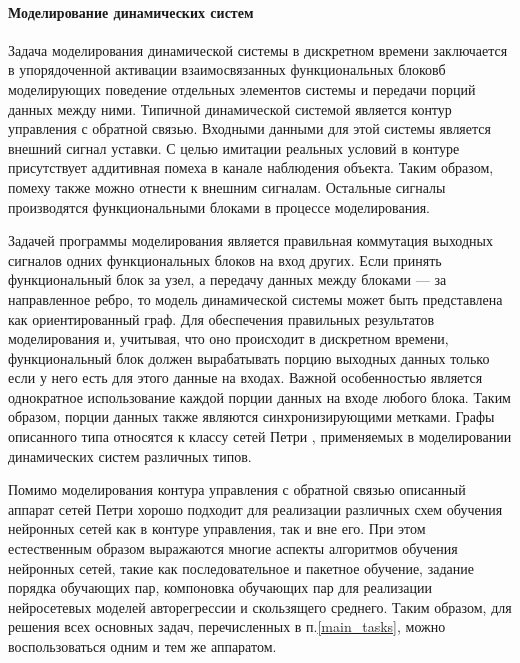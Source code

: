 \paragraph{Моделирование динамических систем}

Задача моделирования динамической системы в дискретном времени
заключается в упорядоченной активации взаимосвязанных функциональных
блоковб моделирующих поведение отдельных элементов системы и передачи
порций данных между ними.  Типичной динамической системой является
контур управления с обратной связью.  Входными данными для этой
системы является внешний сигнал уставки.  С целью имитации реальных
условий в контуре присутствует аддитивная помеха в канале наблюдения
объекта.  Таким образом, помеху также можно отнести к внешним
сигналам.  Остальные сигналы производятся функциональными блоками в
процессе моделирования.

Задачей программы моделирования является правильная коммутация
выходных сигналов одних функциональных блоков на вход других.  Если
принять функциональный блок за узел, а передачу данных между блоками
--- за направленное ребро, то модель динамической системы может быть
представлена как ориентированный граф.  Для обеспечения правильных
результатов моделирования и, учитывая, что оно происходит в дискретном
времени, функциональный блок должен вырабатывать порцию выходных
данных только если у него есть для этого данные на входах.  Важной
особенностью является однократное использование каждой порции данных
на входе любого блока.  Таким образом, порции данных также являются
синхронизирующими метками.  Графы описанного типа относятся к классу
сетей Петри \cite{petri_network,makloh01}, применяемых в моделировании
динамических систем различных типов.

Помимо моделирования контура управления с обратной связью описанный
аппарат сетей Петри хорошо подходит для реализации различных схем
обучения нейронных сетей как в контуре управления, так и вне его.  При
этом естественным образом выражаются многие аспекты алгоритмов
обучения нейронных сетей, такие как последовательное и пакетное
обучение, задание порядка обучающих пар, компоновка обучающих пар для
реализации нейросетевых моделей авторегрессии и скользящего среднего.
Таким образом, для решения всех основных задач, перечисленных в
п.\ref{main_tasks}, можно воспользоваться одним и тем же аппаратом.

